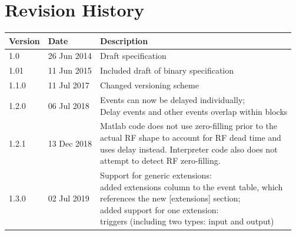 \documentclass{article}
\begin{document}
\section*{Revision History}
\begin{tabular}{lll}
\toprule
Version & Date & Description \\
\midrule
1.0 & 26 Jun 2014 & Draft specification \\
1.01 & 11 Jun 2015 & Included draft of binary specification \\
1.1.0 & 11 Jul 2017 & Changed versioning scheme \\
1.2.0 & 06 Jul 2018 & \makecell{Events can now be delayed individually; \\ Delay events and other events overlap within blocks} \\
1.2.1 & 13 Dec 2018 & \makecell{Matlab code does not use zero-filling prior to the \\ actual RF shape to account for RF dead time and \\ uses delay instead. Interpreter code also does not \\ attempt to detect RF zero-filling.} \\
1.3.0 & 02 Jul 2019 & \makecell{Support for generic extensions: \\ added extensions column to the event table, which \\ references the new [extensions] section; \\ added support for one extension: \\ triggers (including two types: input and output) } \\
\bottomrule
\end{tabular}
\end{document}
